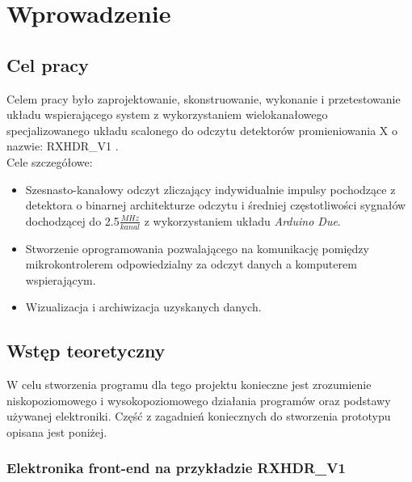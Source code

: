\section{Wprowadzenie}
\subsection{Cel pracy}
\label{cel pracy}

Celem pracy było zaprojektowanie, skonstruowanie, wykonanie i przetestowanie  układu wspierającego system z wykorzystaniem wielokanałowego  specjalizowanego układu scalonego do odczytu detektorów promieniowania X o nazwie: RXHDR\_V1 \cite{master}.\\
Cele szczegółowe:
\begin{itemize}
        \item Szesnasto-kanałowy odczyt zliczający indywidualnie impulsy pochodzące z detektora o binarnej architekturze odczytu i średniej częstotliwości sygnałów dochodzącej do 2.5$\frac{MHz}{kanal}$ z wykorzystaniem układu \textit{Arduino Due}.
        \item Stworzenie oprogramowania pozwalającego na komunikację pomiędzy mikrokontrolerem odpowiedzialny za odczyt danych a komputerem wspierającym. 
        \item Wizualizacja i archiwizacja uzyskanych danych. 
\end{itemize}

\subsection{Wstęp teoretyczny}

W celu stworzenia programu dla tego projektu konieczne jest zrozumienie niskopoziomowego i wysokopoziomowego działania programów oraz podstawy używanej elektroniki. Część z zagadnień koniecznych do stworzenia prototypu opisana jest poniżej. 

\subsubsection{Elektronika front-end na przykładzie RXHDR\_V1}


